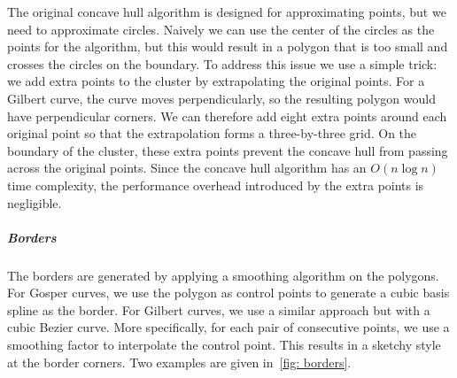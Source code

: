 The original concave hull algorithm is designed for approximating points, but we need to approximate circles.
Naively we can use the center of the circles as the points for the algorithm, but this would result in a polygon that is too small and crosses the circles on the boundary.
To address this issue we use a simple trick: we add extra points to the cluster by extrapolating the original points.
For a Gilbert curve, the curve moves perpendicularly, so the resulting polygon would have perpendicular corners. 
We can therefore add eight extra points around each original point so that the extrapolation forms a three-by-three grid.
On the boundary of the cluster, these extra points prevent the concave hull from passing across the original points.
Since the concave hull algorithm has an $O(n\log n)$ time complexity, the performance overhead introduced by the extra points is negligible.
\subparagraph{Borders} 
The borders are generated by applying a smoothing algorithm on the polygons.
For Gosper curves, we use the polygon as control points to generate a cubic basis spline as the border.
For Gilbert curves, we use a similar approach but with a cubic Bezier curve.
More specifically, for each pair of consecutive points, we use a smoothing factor to interpolate the control point.
This results in a sketchy style at the border corners.
Two examples are given in~\autoref{fig: borders}.

